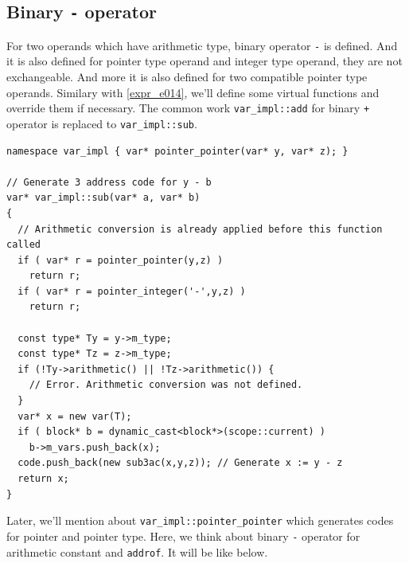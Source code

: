 \subsection{Binary {\tt{-}} operator}
\label{expr_e018}
For two operands which have arithmetic type, binary operator {\tt{-}}
is defined. And it is also defined for pointer type operand and integer type
operand, they are not exchangeable. And more it is also defined for
two compatible pointer type operands.
Similary with \ref{expr_e014}, we'll
define some virtual functions and override them if necessary.
The common work {\tt{var\_impl::add}} for binary {\tt{+}} operator
is replaced to {\tt{var\_impl::sub}}.
\begin{verbatim}
namespace var_impl { var* pointer_pointer(var* y, var* z); }

// Generate 3 address code for y - b
var* var_impl::sub(var* a, var* b)
{
  // Arithmetic conversion is already applied before this function called
  if ( var* r = pointer_pointer(y,z) )
    return r;
  if ( var* r = pointer_integer('-',y,z) )
    return r;

  const type* Ty = y->m_type;
  const type* Tz = z->m_type;
  if (!Ty->arithmetic() || !Tz->arithmetic()) {
    // Error. Arithmetic conversion was not defined. 
  }
  var* x = new var(T);
  if ( block* b = dynamic_cast<block*>(scope::current) )
    b->m_vars.push_back(x);
  code.push_back(new sub3ac(x,y,z)); // Generate x := y - z
  return x;
}
\end{verbatim}
Later, we'll mention about {\tt{var\_impl::pointer\_pointer}}
which generates codes for pointer and pointer type.
Here, we think about binary {\tt{-}} operator for
arithmetic constant and {\tt{addrof}}. It will be like below.

